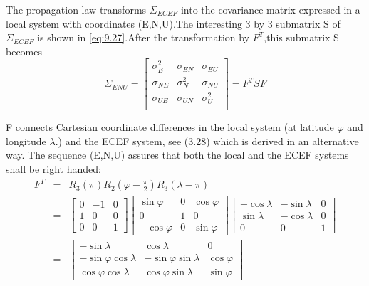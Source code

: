 		The propagation law transforms $\Sigma_{ECEF}$ into the covariance matrix expressed in a local system with coordinates (E,N,U).The interesting 3 by 3 submatrix S of $\Sigma_{ECEF}$ is shown in \ref{eq:9.27}.After the transformation by $F^T$,this submatrix S becomes
		\begin{equation}\label{eq:9.28}
			\Sigma_{ENU} = 
			\begin{bmatrix}
				\sigma^2_E & \sigma_{EN} & \sigma_{EU} \\
				\sigma_{NE}& \sigma^2_N  & \sigma_{NU} \\
				\sigma_{UE}& \sigma_{UN} & \sigma^2_U \\
			\end{bmatrix}
			=F^TSF
		\end{equation} 
			
		F connects Cartesian coordinate differences in the local system (at latitude $\varphi$ and longitude $\lambda$.) and the ECEF system, see (3.28) which is derived in an alternative way. The sequence (E,N,U) assures that both the local and the ECEF systems shall be right handed:
		\begin{equation}\label{eq:9.29}
		\begin{array}{rcl}
			F^T &=& R_3(\pi)R_2(\varphi-\frac{\pi}{2})R_3(\lambda-\pi) \\
				&=&\begin{bmatrix}
						0 & -1 & 0 \\
						1 &  0 & 0 \\
						0 &  0 & 1
					\end{bmatrix}
					\begin{bmatrix}
					\sin \varphi & 0 & \cos \varphi \\
					0 & 1 & 0 \\
					-\cos \varphi& 0 & \sin \varphi
					\end{bmatrix}
					\begin{bmatrix}
					-\cos \lambda & -\sin \lambda & 0 \\
					\sin \lambda & -\cos \lambda & 0 \\
					0 & 			0 & 1 
					\end{bmatrix} \\
				 &=&\begin{bmatrix}
					-\sin \lambda & \cos \lambda & 0 \\
					-\sin \varphi \cos \lambda & -\sin \varphi \sin \lambda & \cos \varphi \\
					\cos \varphi \cos \lambda & \cos \varphi \sin \lambda & \sin \varphi 
					\end{bmatrix}
		\end{array}	
		\end{equation}
			
